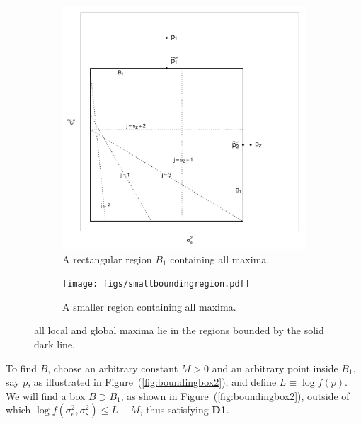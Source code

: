\documentclass{report}
\newcommand{\RL}{f}
\newcommand{\logRL}{\log\RL}
\newcommand{\sigssq}{\sigma_s^2}
\newcommand{\sigesq}{\sigma_e^2}
\newcommand{\logRLss}{\logRL(\sigesq,\sigssq)}
\begin{document}
\begin{figure}[h]
  \begin{subfigure}{.5\textwidth}
	\centering
	\includegraphics[width=.8\linewidth]{figs/boundingbox.pdf}
	\caption{A rectangular region $B_1$ containing all maxima.}
	\label{fig:bigboundingbox}
  \end{subfigure}
  \begin{subfigure}{.5\textwidth}
	\centering
	\texttt{[image: figs/smallboundingregion.pdf]}
	\caption{A smaller region containing all maxima.}
	\label{fig:smallboundingbox}
  \end{subfigure}
  \caption{all local and global maxima lie in the regions bounded by the solid
                dark line.
               }
  \label{fig:boundingbox}
\end{figure}

To find $B$, choose an arbitrary constant $M>0$ and an arbitrary point inside $B_1$, say $p$, as illustrated in Figure~(\ref{fig:boundingbox2}), and define $L \equiv \logRL(p)$.  We will find a box $B\supset B_1$, as shown in Figure~(\ref{fig:boundingbox2}), outside of which $\logRLss \le L-M$, thus satisfying \textbf{D1}.
\end{document}
